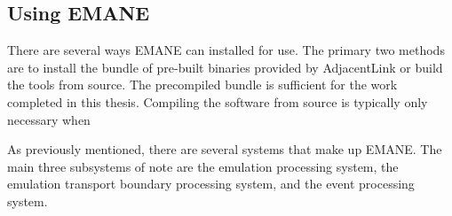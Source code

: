 \subsection{Using EMANE}
There are several ways EMANE can installed for use.
The primary two methods are to install the bundle of pre-built binaries provided by AdjacentLink or build the tools from source.
The precompiled bundle is sufficient for the work completed in this thesis. Compiling the software from source is typically only necessary when 
        

As previously mentioned, there are several systems that make up EMANE.
The main three subsystems of note are the emulation processing system, the emulation transport boundary processing system, and the event processing system.



